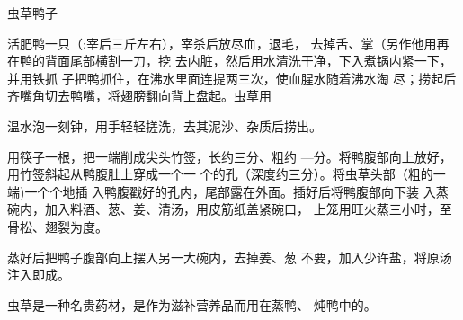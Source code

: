 \begin{recipe}{虫草鸭子}

\ingredients


\cooking

\step 活肥鸭一只（:宰后三斤左右），宰杀后放尽血，退毛， 去掉舌、掌（另作他用再在鸭的背面尾部横割一刀，挖 去内脏，然后用水清洗干净，下入煮锅内紧一下，并用铁抓 子把鸭抓住，在沸水里面连提两三次，使血腥水随着沸水淘 尽；捞起后齐嘴角切去鸭嘴，将翅膀翻向背上盘起。虫草用

温水泡一刻钟，用手轻轻搓洗，去其泥沙、杂质后捞出。

用筷子一根，把一端削成尖头竹签，长约三分、粗约 —分。将鸭腹部向上放好，用竹签斜起从鸭腹肚上穿成一个一 个的孔（深度约三分）。将虫草头部（粗的一端)一个个地插 入鸭腹戳好的孔内，尾部露在外面。插好后将鸭腹部向下装 入蒸碗内，加入料酒、葱、姜、清汤，用皮筋纸盖紧碗口， 上笼用旺火蒸三小时，至骨松、翅裂为度。

\step 蒸好后把鸭子腹部向上摆入另一大碗内，去掉姜、葱 不要，加入少许盐，将原汤注入即成。

\notes

虫草是一种名贵药材，是作为滋补营养品而用在蒸鸭、 炖鸭中的。

\end{recipe}

